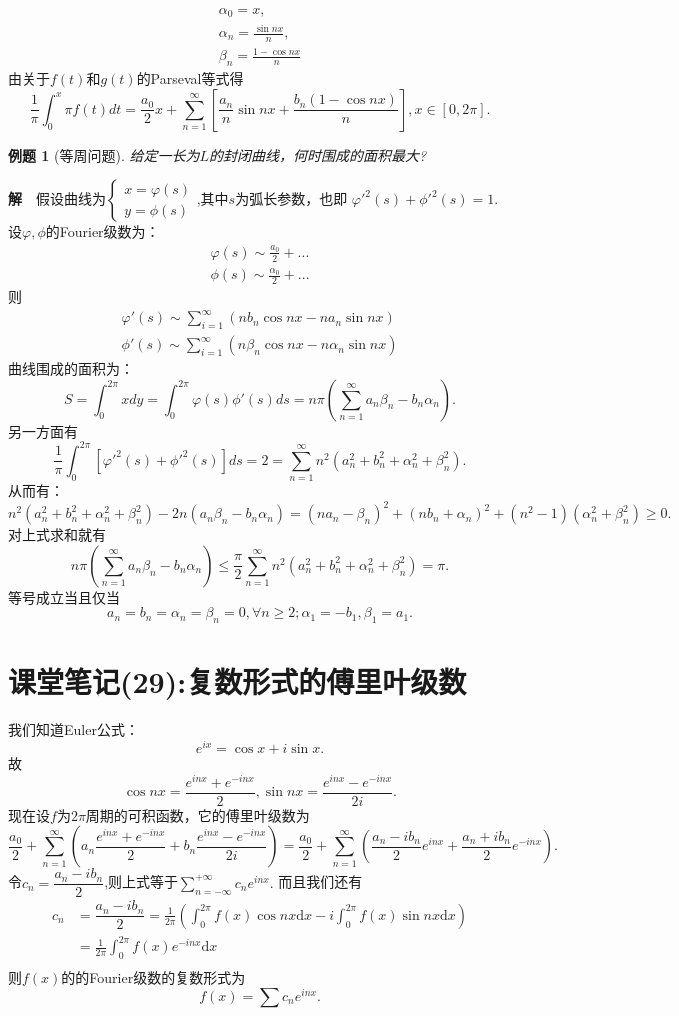 \documentclass[UTF8]{article}
\newcommand{\dx}{\mathrm{d}x}
\newcommand{\jie}{\textbf{解}$\quad$}
\newtheorem{exa}{\hspace{2em}例题}[section]
\begin{document}
  \begin{gather*}
    \alpha_0=x,\\
    \alpha_n=\frac{\sin nx}{n},\\
    \beta_n=\frac{1-\cos nx}{n}
  \end{gather*}
  由关于$f(t)$和$g(t)$的Parseval等式得
  $$\frac{1}{\pi}\int_0^x\pi f(t)dt=\frac{a_0}{2}x+
  \sum_{n=1}^\infty\left[\frac{a_n}{n}\sin nx+\frac{b_n(1-\cos nx)}{n}\right],x\in[0,2\pi].$$
  \begin{exa}[等周问题]
    给定一长为$L$的封闭曲线，何时围成的面积最大?
  \end{exa}
  \jie 假设曲线为$\begin{cases}x=\varphi(s)\\y=\phi(s)\end{cases}$,其中$s$为弧长参数，也即
  $\varphi'^2(s)+\phi'^2(s)=1.$设$\varphi,\phi$的Fourier级数为：
  \begin{gather*}
    \varphi(s)\sim\frac{a_0}{2}+...\\
    \phi(s)\sim\frac{\alpha_0}{2}+...
  \end{gather*}
  则
  \begin{gather*}
    \varphi'(s)\sim\sum_{i=1}^\infty(nb_n\cos nx-na_n\sin nx)\\
    \phi'(s)\sim\sum_{i=1}^\infty(n\beta_n\cos nx-n\alpha_n\sin nx)
  \end{gather*}
  曲线围成的面积为：
  $$S=\int_0^{2\pi}xdy=\int_0^{2\pi}\varphi(s)\phi'(s)ds=n\pi\left(\sum_{n=1}^\infty a_n\beta_n-b_n\alpha_n\right).$$
  另一方面有
  $$\frac{1}{\pi}\int_0^{2\pi}[\varphi'^2(s)+\phi'^2(s)]ds=2=\sum_{n=1}^\infty n^2(a_n^2+b_n^2+\alpha_n^2+\beta_n^2).$$
  从而有：
  $$n^2(a_n^2+b_n^2+\alpha_n^2+\beta_n^2)-2n(a_n\beta_n-b_n\alpha_n)=(na_n-\beta_n)^2+(nb_n+\alpha_n)^2+
  (n^2-1)(\alpha_n^2+\beta_n^2)\ge 0.$$
  对上式求和就有
  $$n\pi\left(\sum_{n=1}^\infty a_n\beta_n-b_n\alpha_n\right)\le
  \frac{\pi}{2}\sum_{n=1}^\infty n^2(a_n^2+b_n^2+\alpha_n^2+\beta_n^2)=\pi.$$
  等号成立当且仅当
  $$a_n=b_n=\alpha_n=\beta_n=0,\forall n\ge2; \alpha_1=-b_1,\beta_1=a_1.$$
  \clearpage
  \section{课堂笔记(29):复数形式的傅里叶级数}
  我们知道Euler公式：
  $$e^{ix}=\cos x+i\sin x.$$
  故
  $$\cos nx=\frac{e^{inx}+e^{-inx}}{2},\sin nx=\frac{e^{inx}-e^{-inx}}{2i}.$$
  现在设$f$为$2\pi$周期的可积函数，它的傅里叶级数为
  $$\frac{a_0}{2}+\sum_{n=1}^\infty\left(a_n\frac{e^{inx}+e^{-inx}}{2}+b_n\frac{e^{inx}-e^{-inx}}{2i}\right)=
  \frac{a_0}{2}+\sum_{n=1}^\infty\left(\frac{a_n-ib_n}{2}e^{inx}+\frac{a_n+ib_n}{2}e^{-inx}\right).$$
  令$c_n=\dfrac{a_n-ib_n}{2}$,则上式等于$\sum\limits_{n=-\infty}^{+\infty} c_ne^{inx}.$
  而且我们还有
  \begin{align*}
    c_n&=\dfrac{a_n-ib_n}{2}=\frac{1}{2\pi}\left(\int_0^{2\pi}f(x)\cos nx\dx
    -i\int_0^{2\pi}f(x)\sin nx\dx\right)\\
    &=\frac{1}{2\pi}\int_0^{2\pi}f(x)e^{-inx}\dx\\
  \end{align*}
  则$f(x)$的的Fourier级数的复数形式为
  $$f(x)=\sum c_ne^{inx}.$$
\end{document}
